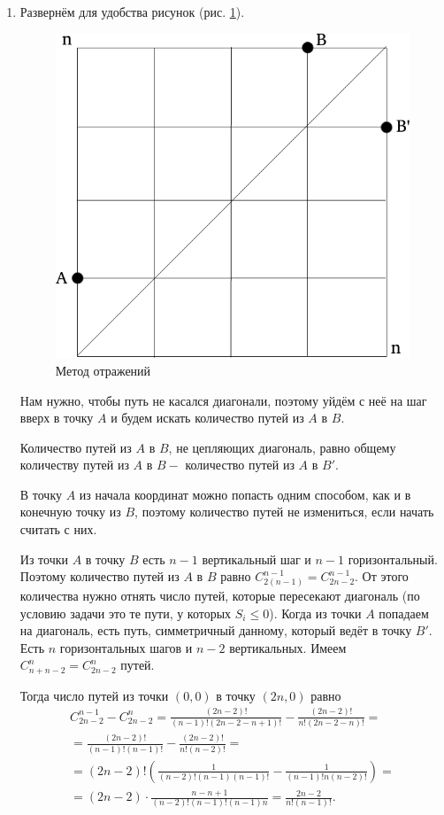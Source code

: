 \documentclass{book}
\begin{document}
\begin{enumerate}[label=(\roman*)]
\item Развернём для удобства рисунок (рис. \ref{fig:4221}).

\begin{figure}[h!]
  \centering
  \includegraphics[width=.6\textwidth]{./pictures/4_22_1.png}
  \caption{Метод отражений}
  \label{fig:4221}
\end{figure}

Нам нужно, чтобы путь не касался диагонали,
поэтому уйдём с неё на шаг вверх в точку $A$ и будем искать количество путей из $A$ в $B$.

Количество путей из $A$ в $B$, не цепляющих диагональ,
равно общему количеству путей из $A$ в $B -$ количество путей из $A$ в $B'$.

В точку $A$ из начала координат можно попасть одним способом,
как и в конечную точку из $B$, поэтому количество путей не измениться, если начать считать с них.

Из точки $A$ в точку $B$ есть $n - 1$ вертикальный шаг и $n - 1$ горизонтальный.
Поэтому количество путей из $A$ в $B$ равно $C_{2 \left( n-1 \right)}^{n-1} = C_{2n-2}^{n-1}$.
От этого количества нужно отнять число путей,
которые пересекают диагональ (по условию задачи это те пути, у которых $S_i \leq 0$).
Когда из точки $A$ попадаем на диагональ, есть путь, симметричный данному, который ведёт в точку $B'$.
Есть $n$ горизонтальных шагов и $n - 2$ вертикальных.
Имеем $C_{n+n-2}^n = C_{2n-2}^n$ путей.

Тогда число путей из точки $ \left( 0, 0 \right) $ в точку $ \left( 2n, 0 \right) $ равно
\begin{equation*}
\begin{split}
C_{2n-2}^{n-1} - C_{2n-2}^n =
\frac{ \left( 2n-2 \right)!}{ \left( n-1 \right)! \left( 2n-2-n+1 \right)!} -
\frac{ \left( 2n-2 \right)!}{n! \left( 2n-2-n \right)!} = \\
= \frac{ \left( 2n-2 \right)!}{ \left( n-1 \right)! \left( n-1 \right)!} -
\frac{ \left( 2n-2 \right)!}{n! \left( n-2 \right)!} = \\
= \left( 2n-2 \right)!
\left( \frac{1}{ \left( n-2 \right)! \left( n-1 \right) \left( n-1 \right)! } -
\frac{1}{ \left( n-1 \right)! n \left( n-2 \right)!} \right) = \\
= \left( 2n-2 \right) \cdot \frac{n - n + 1}{\left( n-2 \right)! \left( n-1 \right)! \left( n-1 \right) n} =
\frac{2n-2}{n! \left( n-1 \right)!}.
\end{split}
\end{equation*}


\end{enumerate}
\end{document}
